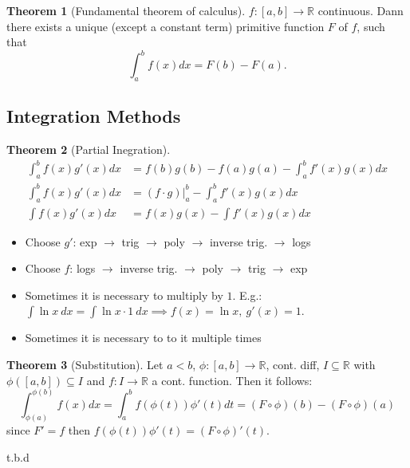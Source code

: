 \documentclass[a4paper, 10pt]{article}
\theoremstyle{definition}
\theoremstyle{named}
\newtheorem*{ntheorem_wrapper}{Theorem}
\newenvironment{ntheorem}%
    {\begin{mdframed}[style=important]\begin{ntheorem_wrapper}}%
    {\end{ntheorem_wrapper}\end{mdframed}}
\newcommand{\R}{\mathbb{R}}
\begin{document}
\begin{ntheorem}[Fundamental theorem of calculus]
    $f: [a, b] \to \R$ continuous. Dann there exists a unique (except a constant term) primitive function $F$ of $f$, such that 
    $$\int_a^b f(x) dx = F(b) - F(a).$$
\end{ntheorem}

\subsection{Integration Methods}
\begin{ntheorem}[Partial Inegration]
    \begin{align*}
        \int_a^b f(x) g'(x) dx &= f(b)g(b) - f(a)g(a) - \int_a^b f'(x)g(x) dx \\
        \int_a^b f(x) g'(x) dx &= (f \cdot g)|_a^b - \int_a^b f'(x)g(x) dx \\
        \int f(x)g'(x) dx &= f(x) g(x) - \int f'(x) g(x) dx
    \end{align*}
\end{ntheorem}
\begin{itemize}
    \item Choose $g'$: exp $\rightarrow$ trig $\rightarrow$ poly $\rightarrow$ inverse trig. $\rightarrow$ logs
    \item Choose $f$: logs $\rightarrow$ inverse trig. $\rightarrow$ poly $\rightarrow$ trig $\rightarrow$ exp
    \item Sometimes it is necessary to multiply by $1$. E.g.: $\int \ln x \ dx = \int \ln x \cdot 1 \ dx \implies f(x) = \ln x, \ g'(x) = 1$.
    \item Sometimes it is necessary to to it multiple times
\end{itemize}

\begin{ntheorem}[Substitution]
    Let $a < b$, $\phi: [a, b] \to \R$, cont. diff, $I \subseteq \R$ with $\phi([a, b]) \subseteq I$ and $f: I \to \R$ a cont. function. Then it follows:
    $$\int_{\phi(a)}^{\phi(b)} f(x) dx = \int_a^b f(\phi(t)) \phi'(t) dt = (F \circ \phi)(b) - (F \circ \phi)(a)$$
    since $F'=f$ then $f(\phi(t))\phi'(t) = (F \circ \phi)'(t)$.
\end{ntheorem}

t.b.d
\end{document}
